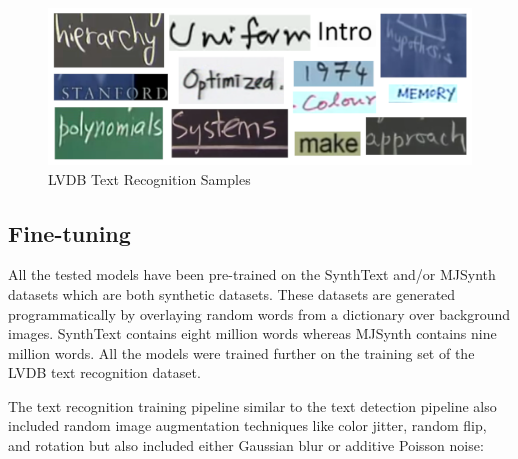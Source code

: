 \begin{figure}[H]
        \centering
        \includegraphics[width=140mm]{figures/lvdb_textrec_collage.png}
        \caption{LVDB Text Recognition Samples}
        \label{meth:lvdb_textred_collage}
\end{figure}

\subsection{Fine-tuning}

All the tested models have been pre-trained on the SynthText \cite{gupta_synthetic_2016} and/or MJSynth \cite{jaderberg_synthetic_2014} datasets which are both synthetic datasets. These datasets are generated programmatically by overlaying random words from a dictionary over background images. SynthText contains eight million words whereas MJSynth contains nine million words. All the models were trained further on the training set of the LVDB text recognition dataset.

The text recognition training pipeline similar to the text detection pipeline also included random image augmentation techniques like color jitter, random flip, and rotation but also included either Gaussian blur or additive Poisson noise:

